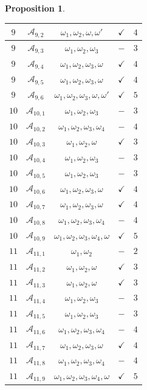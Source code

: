 \documentclass[12pt]{amsart}
\newtheorem{prop}[thm]{Proposition}
\theoremstyle{definition}
\theoremstyle{remark}
\newcommand{\Lg}{\mathfrak{g}}
\newcommand{\CA}{\mathcal{A}}
\newcommand{\mi}{\boldsymbol{-}}
\newcommand{\la}{\lambda}
\newcommand{\om}{\omega}
\begin{document}
\begin{prop}
\begin{tabular}{|c|c|c|c|c|}
$9$ & $\CA_{9,2}$  & $\om_1,\om_2,\om,\om'$ & $\checkmark$   & $4$ \\ \hline
$9$ & $\CA_{9,3}$  & $\om_1,\om_2,\om_3$ & $\mi$          & $3$ \\ \hline
$9$ & $\CA_{9,4}$  & $\om_1,\om_2,\om_3,\om$ & $\checkmark$   & $4$ \\ \hline
$9$ & $\CA_{9,5}$  & $\om_1,\om_2,\om_3,\om$ & $\checkmark$   & $4$ \\ \hline
$9$ & $\CA_{9,6}$  & $\om_1,\om_2,\om_3,\om,\om'$ &$\checkmark$& $5$ \\ \hline
$10$& $\CA_{10,1}$ & $\om_1,\om_2,\om_3$ & $\mi$         & $3$ \\ \hline
$10$& $\CA_{10,2}$ & $\om_1,\om_2,\om_3,\om_4$ & $\mi$       & $4$ \\ \hline
$10$& $\CA_{10,3}$ & $\om_1,\om_2,\om$   & $\checkmark$  & $3$ \\ \hline
$10$& $\CA_{10,4}$ & $\om_1,\om_2,\om_3$  & $\mi$         & $3$ \\ \hline
$10$& $\CA_{10,5}$ & $\om_1,\om_2,\om_3$  & $\mi$         & $3$ \\ \hline
$10$& $\CA_{10,6}$ & $\om_1,\om_2,\om_3,\om$  & $\checkmark$  & $4$ \\ \hline
$10$& $\CA_{10,7}$ & $\om_1,\om_2,\om_3,\om$  & $\checkmark$  & $4$ \\ \hline
$10$& $\CA_{10,8}$ & $\om_1,\om_2,\om_3,\om_4$ & $\mi$        & $4$ \\ \hline
$10$& $\CA_{10,9}$ & $\om_1,\om_2,\om_3,\om_4,\om$&$\checkmark$& $5$ \\ \hline
%
$11$& $\CA_{11,1}$ & $\om_1,\om_2$  & $\mi$         & $2$ \\ \hline
$11$& $\CA_{11,2}$ & $\om_1,\om_2,\om$   & $\checkmark$  & $3$ \\ \hline
$11$& $\CA_{11,3}$ & $\om_1,\om_2,\om$   & $\checkmark$  & $3$ \\ \hline
$11$& $\CA_{11,4}$ & $\om_1,\om_2,\om_3$ & $\mi$         & $3$ \\ \hline
$11$& $\CA_{11,5}$ & $\om_1,\om_2,\om_3$ & $\mi$         & $3$ \\ \hline 
$11$& $\CA_{11,6}$ & $\om_1,\om_2,\om_3,\om_4$ & $\mi$   & $4$ \\ \hline 
$11$& $\CA_{11,7}$ & $\om_1,\om_2,\om_3,\om$ & $\checkmark$  & $4$ \\ \hline
$11$& $\CA_{11,8}$ & $\om_1,\om_2,\om_3,\om_4$ & $\mi$   & $4$ \\ \hline 
$11$& $\CA_{11,9}$ & $\om_1,\om_2,\om_3,\om_4,\om$ & $\checkmark$   & $5$ \\ \hline 
\end{tabular} 
\end{prop}
\end{document}
